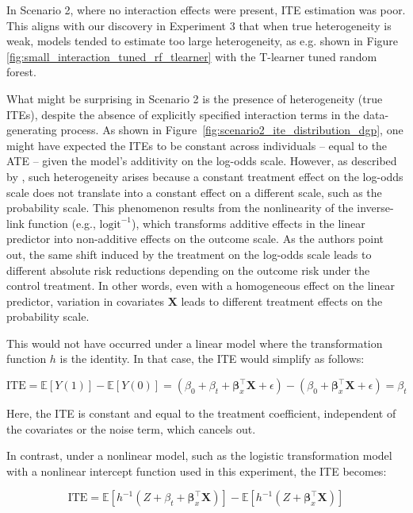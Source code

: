 In Scenario 2, where no interaction effects were present, ITE estimation was poor. This aligns with our discovery in Experiment 3 that when true heterogeneity is weak, models tended to estimate too large heterogeneity, as e.g. shown in Figure \ref{fig:small_interaction_tuned_rf_tlearner} with the T-learner tuned random forest.

\medskip

What might be surprising in Scenario 2 is the presence of heterogeneity (true ITEs), despite the absence of explicitly specified interaction terms in the data-generating process. As shown in Figure~\ref{fig:scenario2_ite_distribution_dgp}, one might have expected the ITEs to be constant across individuals -- equal to the ATE -- given the model's additivity on the log-odds scale. However, as described by \citet{hoogland2021}, such heterogeneity arises because a constant treatment effect on the log-odds scale does not translate into a constant effect on a different scale, such as the probability scale. This phenomenon results from the nonlinearity of the inverse-link function (e.g., $\text{logit}^{-1}$), which transforms additive effects in the linear predictor into non-additive effects on the outcome scale. As the authors point out, the same shift induced by the treatment on the log-odds scale leads to different absolute risk reductions depending on the outcome risk under the control treatment. In other words, even with a homogeneous effect on the linear predictor, variation in covariates $\mathbf{X}$ leads to different treatment effects on the probability scale.

This would not have occurred under a linear model where the transformation function $h$ is the identity. In that case, the ITE would simplify as follows:

\begin{equation}
\text{ITE} = \mathbb{E}[Y(1)] - \mathbb{E}[Y(0)] = (\beta_0 + \beta_t + \boldsymbol{\beta}_x^\top \mathbf{X} + \epsilon) - (\beta_0 + \boldsymbol{\beta}_x^\top \mathbf{X} + \epsilon) = \beta_t
\end{equation}

Here, the ITE is constant and equal to the treatment coefficient, independent of the covariates or the noise term, which cancels out.

In contrast, under a nonlinear model, such as the logistic transformation model with a nonlinear intercept function used in this experiment, the ITE becomes:

\begin{equation}
\text{ITE} = \mathbb{E}[h^{-1}(Z + \beta_t + \boldsymbol{\beta}_x^\top \mathbf{X})] - \mathbb{E}[h^{-1}(Z + \boldsymbol{\beta}_x^\top \mathbf{X})]
\end{equation}

